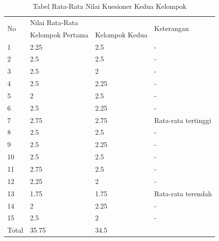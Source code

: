 \begin{table}[h]
\centering
\caption[Tabel Rata-Rata Nilai Kuesioner Kedua Kelompok]{Tabel Rata-Rata
Nilai Kuesioner Kedua Kelompok}
\label{tab:ratanilaikuesionerkeduakelompok}
\begin{tabular}{|l|l|l|l|}
\hline
\multirow{2}{*}{No} & \multicolumn{2}{l|}{Nilai Rata-Rata} & \multirow{2}{*}{Keterangan} \\ \cline{2-3}
                    & Kelompok Pertama   & Kelompok Kedua  &                             \\ \hline
1                   & 2.25               & 2.5             & -                           \\ \hline
2                   & 2.5                & 2.5             & -                           \\ \hline
3                   & 2.5                & 2               & -                           \\ \hline
4                   & 2.5                & 2.25            & -                           \\ \hline
5                   & 2                  & 2.5             & -                           \\ \hline
6                   & 2.5                & 2.25            & -                           \\ \hline
7                   & 2.75               & 2.75            & Rata-rata tertinggi         \\ \hline
8                   & 2.5                & 2.5             & -                           \\ \hline
9                   & 2.5                & 2.25            & -                           \\ \hline
10                  & 2.5                & 2.5             & -                           \\ \hline
11                  & 2.75               & 2.5             & -                           \\ \hline
12                  & 2.25               & 2               & -                           \\ \hline
13                  & 1.75               & 1.75            & Rata-rata terendah          \\ \hline
14                  & 2                  & 2.25            & -                           \\ \hline
15                  & 2.5                & 2               & -                           \\ \hline
Total               & 35.75              & 34.5            &                             \\ \hline
\end{tabular}
\end{table}

